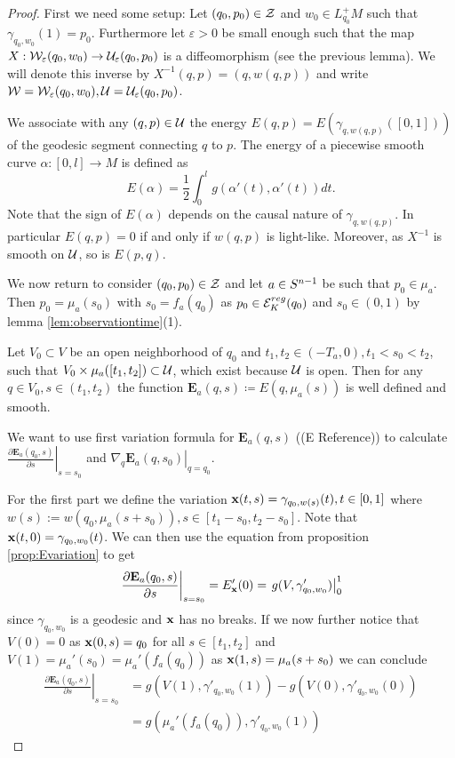 \begin{proof}
    First we need some setup: Let $(q_0,p_0)\in {\mathcal{Z}}$ and $w_0\in L^+_{q_0}M$ such that $\gamma_{q_0,w_0}(1) = p_0$. Furthermore let $\varepsilon>0$ be small enough such that the map $X:{\mathcal{W}}_\varepsilon(q_0,w_0)\to \mathcal{U}_\varepsilon(q_0,p_0)$ is a diffeomorphism (see the previous lemma). We will denote this inverse by $X^{-1}(q,p) = (q,w(q,p))$ and write ${\mathcal{W}}={\mathcal{W}}_\varepsilon(q_0,w_0), \mathcal{U}=\mathcal{U}_\varepsilon(q_0,p_0)$.
    
    We associate with any $(q,p)\in {\mathcal{U}}$ the energy $E(q,p)=E(\gamma_{q,w(q,p)}([0,1]))$ of the geodesic segment connecting $q$ to $p$. The energy of a piecewise smooth curve $\alpha:[0,l]\to M$ is defined as 
    \[
        E(\alpha) = \frac{1}{2}\int_0^l g(\alpha'(t),\alpha'(t))dt.
    \]
    Note that the sign of $E(\alpha)$ depends on the causal nature of $\gamma_{q,w(q,p)}$. In particular $E(q,p)=0$ if and only if $w(q,p)$ is light-like. Moreover, as $X^{-1}$ is smooth on $\mathcal{U}$, so is $E(p,q)$.
    
    We now return to consider $(q_0,p_0)\in {\mathcal{Z}}$ and let $a\in {S^{n-1}}$ be such that $p_0 \in \mu_a$. Then $p_0=\mu_a(s_0)$ with $s_0=f_a(q_0)$ as $p_0 \in {{\mathcal{E}}^{reg}_K}(q_0)$ and $s_0\in (0,1)$ by lemma \ref{lem:observationtime}(1). 
    
    Let $V_0\subset V$ be an open neighborhood of $q_0$ and $t_1,t_2\in (-T_a,0), t_1<s_0<t_2$, such that $V_0\times\mu_a([t_1,t_2])\subset \mathcal{U}$, which exist because $\mathcal{U}$ is open. Then for any $q\in V_0, s\in (t_1,t_2)$ the function $\mathbf{E}_a(q,s)\coloneqq E(q,\mu_a(s))$ is well defined and smooth.
    
    We want to use first variation formula for $\mathbf{E}_a(q,s)$ ((E Reference)) to calculate $\left.\frac{\partial\mathbf{E}_a(q_0,s)}{\partial s}\right\rvert_{s=s_0}$ and $\left.\nabla_q\mathbf{E}_a(q,s_0)\right\rvert_{q=q_0}$.
    
    For the first part we define the variation $\mathbf{x}(t,s) = \gamma_{q_0,w(s)}(t), t\in [0,1]$ where $w(s):= w(q_0,\mu_a(s+s_0)), s\in [t_1-s_0,t_2-s_0]$. Note that $\mathbf{x}(t,0)=\gamma_{q_0,w_0}(t)$. We can then use the equation from proposition \ref{prop:Evariation} to get
    \begin{align*}
        \left.\frac{\partial\mathbf{E}_a(q_0,s)}{\partial s}\right\rvert_{s=s_0} = E'_{\mathbf{x}}(0) =  \left.g(V,\gamma_{q_0,w_0}')\right\rvert^1_0
    \end{align*}
    since $\gamma_{q_0,w_0}$ is a geodesic and $\mathbf{x}$ has no breaks. If we now further notice that $V(0)=0$ as $\mathbf{x}(0,s)=q_0$ for all $s\in[t_1,t_2]$ and $V(1) = \mu_a'(s_0) = \mu_a'(f_a(q_0))$ as $\mathbf{x}(1,s) = \mu_a(s+s_0)$ we can conclude 
    \begin{align*}
        \left.\frac{\partial\mathbf{E}_a(q_0,s)}{\partial s}\right\rvert_{s=s_0} &= g(V(1),\gamma'_{q_0,w_0}(1)) - g(V(0),\gamma'_{q_0,w_0}(0))\\
        &= g(\mu_a'(f_a(q_0)),\gamma'_{q_0,w_0}(1))
    \end{align*}
    

\end{proof}
